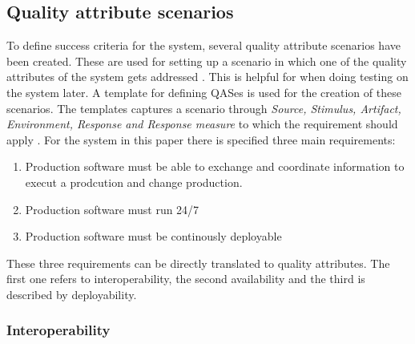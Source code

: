 \documentclass[conference]{IEEEtran}
\begin{document}
\subsection{Quality attribute scenarios}
\label{sec:qas}
To define success criteria for the system, several quality attribute scenarios have been created. These are used for setting up a scenario in which one of the quality attributes of the system gets addressed \cite{bass2021software}. This is helpful for when doing testing on the system later.
A template for defining QASes is used for the creation of these scenarios. The templates captures a scenario through \textit{Source, Stimulus, Artifact, Environment, Response and Response measure} to which the requirement should apply \cite{bass2021software}. \newline
For the system in this paper there is specified three main requirements:
\begin{enumerate}
    \item Production software must be able to exchange and coordinate information to execut a prodcution and change production.
    \item Production software must run 24/7
    \item Production software must be continously deployable
\end{enumerate}
These three requirements can be directly translated to quality attributes. The first one refers to interoperability, the second availability and the third is described by deployability. \newline

\subsubsection{Interoperability}
\end{document}
